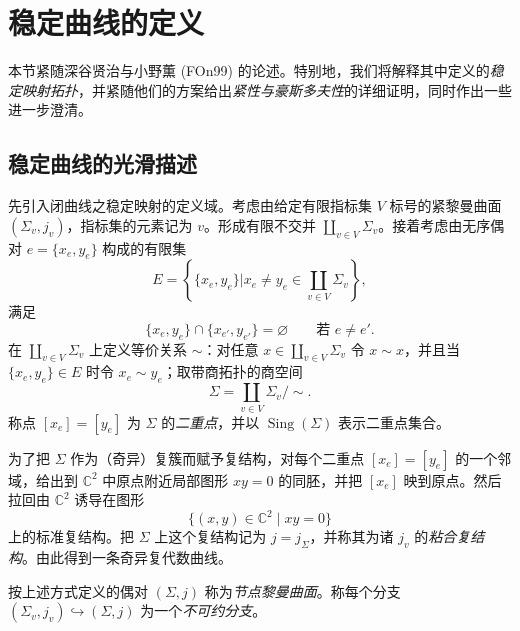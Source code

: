 \section{稳定曲线的定义}
\label{sec:definition-stable-curves}

本节紧随深谷贤治与小野薫 (FOn99) 的论述。特别地，我们将解释其中定义的\emph{稳定映射拓扑}，并紧随他们的方案给出\emph{紧性与豪斯多夫性}的详细证明，同时作出一些进一步澄清。

\subsection{稳定曲线的光滑描述}
\label{subsec:smooth-description-stable-curves}

先引入闭曲线之稳定映射的定义域。考虑由给定有限指标集 $V$ 标号的紧黎曼曲面 $(\Sigma_v,j_v)$，指标集的元素记为 $v$。形成有限不交并
$\coprod_{v\in V}\Sigma_v$。接着考虑由无序偶对
$e=\{x_e,y_e\}$ 构成的有限集
\[
 E=\left\{\{x_e,y_e\}\mathrel{\Big|}
 x_e\ne y_e\in\coprod_{v\in V}\Sigma_v\right\},
\]
满足
\begin{equation}
 \{x_e,y_e\}\cap\{x_{e'},y_{e'}\}=\varnothing
 \qquad\text{若 }e\ne e'.
 \label{eq:nodal-pairwise-disjoint}
\end{equation}
在 $\coprod_{v\in V}\Sigma_v$ 上定义等价关系 $\sim$：对任意
$x\in\coprod_{v\in V}\Sigma_v$ 令 $x\sim x$，并且当
$\{x_e,y_e\}\in E$ 时令 $x_e\sim y_e$；取带商拓扑的商空间
\[
 \Sigma=\coprod_{v\in V}\Sigma_v/\sim.
\]
称点 $[x_e]=[y_e]$ 为 $\Sigma$ 的\emph{二重点}，并以
$\operatorname{Sing}(\Sigma)$ 表示二重点集合。

为了把 $\Sigma$ 作为（奇异）复簇而赋予复结构，对每个二重点
$[x_e]=[y_e]$ 的一个邻域，给出到 $\mathbb C^2$ 中原点附近局部图形 $xy=0$ 的同胚，并把 $[x_e]$ 映到原点。然后拉回由
$\mathbb C^2$ 诱导在图形
\[
 \{(x,y)\in\mathbb C^2\mid xy=0\}
\]
上的标准复结构。把 $\Sigma$ 上这个复结构记为 $j=j_\Sigma$，并称其为诸 $j_v$ 的\emph{粘合复结构}。由此得到一条奇异复代数曲线。

\begin{definition}\label{def:nodal-riemann-surface}
按上述方式定义的偶对 $(\Sigma,j)$ 称为\emph{节点黎曼曲面}。称每个分支
$(\Sigma_v,j_v)\hookrightarrow(\Sigma,j)$ 为一个\emph{不可约分支}。
\end{definition}

